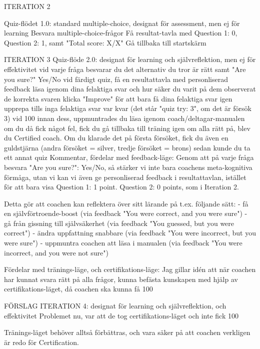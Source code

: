 ITERATION 2

Quiz-flödet 1.0: standard multiple-choice, designat för assessment, men ej för learning
Besvara multiple-choice-frågor
Få resultat-tavla med Question 1: 0, Question 2: 1, samt "Total score: X/X"
Gå tillbaka till startskärm


ITERATION 3
Quiz-flöde 2.0: designat för learning och självreflektion, men ej för effektivitet
vid varje fråga besvarar du det alternativ du tror är rätt samt "Are you sure?" Yes/No
vid färdigt quiz, få en resultattavla med personliserad feedback
läsa igenom dina felaktiga svar och hur säker du varit på dem 
observerat de korrekta svaren
klicka "Improve" för att bara få dina felaktiga svar igen
upprepa tills inga felaktiga svar var kvar (det står "quiz try: 3", om det är försök 3)
vid 100%
innan dess, uppmuntrades du läsa igenom coach/deltagar-manualen
om du då fick något fel, fick du gå tillbaka till träning igen
om alla rätt på, blev du Certified coach. Om du klarade det på första försöket, fick du även en guldstjärna (andra försöket = silver, tredje försöket = brons)
sedan kunde du ta ett annat quiz
Kommentar, fördelar med feedback-läge:
Genom att på varje fråga besvara "Are you sure?": Yes/No, så stärker vi inte bara coachens meta-kognitiva förmåga, utan vi kan vi även ge personliserad feedback i resultattavlan, istället för att bara visa Question 1: 1 point. Question 2: 0 points, som i Iteration 2.

Detta gör att coachen kan reflektera över sitt lärande på t.ex. följande sätt:
- få en självförtroende-boost (via feedback "You were correct, and you were sure")
- gå från gissning till självsäkerhet (via feedback "You guessed, but you were correct")
- ändra uppfattning snabbare (via feedback "You were incorrect, but you were sure")
- uppmuntra coachen att läsa i manualen (via feedback "You were incorrect, and you were not sure")

Fördelar med tränings-läge, och certifikations-läge:
Jag gillar idén att när coachen har kunnat svara rätt på alla frågor, kunna befästa kunskapen med hjälp av certifikations-läget, då coachen ska kunna få 100%

FÖRSLAG ITERATION 4: designat för learning och självreflektion, och effektivitet
Problemet nu, var att de tog certifikations-läget och inte fick 100%

Tränings-läget behöver alltså förbättras, och vara säker på att coachen verkligen är redo för Certification. 

